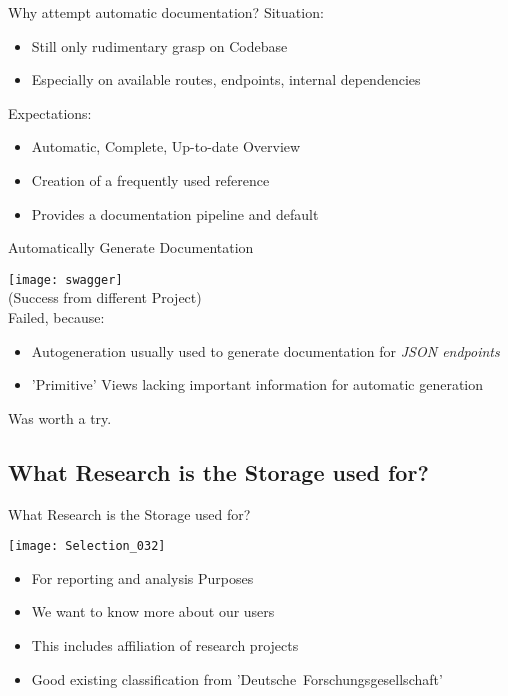 \begin{frame}[c]{Why attempt automatic documentation?} 
    \large
    Situation:
    \begin{itemize}[<+(1)->]
        \item Still only rudimentary grasp on Codebase
        \item Especially on available routes, endpoints, internal dependencies
    \end{itemize}
    \pause
    Expectations:
    \begin{itemize}[<+(1)->]
        \item Automatic, Complete, Up-to-date Overview
        \item Creation of a frequently used reference
        \item Provides a documentation pipeline and default
    \end{itemize}
\end{frame}

\begin{frame}[c]{Automatically Generate Documentation}
    \begin{multicols}{2}
        \texttt{[image: swagger]} \\
        (Success from different Project) \\
        \large
        Failed, because:
        \begin{itemize}[<+(1)->]
            \item Autogeneration usually used to generate documentation for {\em JSON endpoints}
            \item 'Primitive' Views lacking important information for automatic generation
        \end{itemize}
        Was worth a try.
    \end{multicols}
\end{frame}


\subsection{What Research is the Storage used for?}

\begin{frame}[c]{What Research is the Storage used for?}
    \begin{multicols}{2}
        \texttt{[image: Selection\_032]} \\
        \begin{itemize}[<+(1)->]
            \item For reporting and analysis Purposes
            \item We want to know more about our users
            \item This includes affiliation of research projects
            \item Good existing classification from 'Deutsche~Forschungsgesellschaft'
        \end{itemize}
    \end{multicols}
\end{frame}


